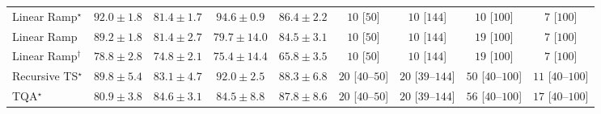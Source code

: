 \begin{tabular}{l|cccc|cccc|}
Linear Ramp$^\star$ & {\cellcolor[HTML]{760C71}} \color[HTML]{F1F1F1} $92.0\pm 1.8$ & {\cellcolor[HTML]{8B5CAA}} \color[HTML]{F1F1F1} $81.4\pm 1.7$ & {\cellcolor[HTML]{5D055A}} \color[HTML]{F1F1F1} $94.6\pm 0.9$ & {\cellcolor[HTML]{863595}} \color[HTML]{F1F1F1} $86.4\pm 2.2$ & {\cellcolor[HTML]{FFF7F3}} \color[HTML]{000000} $10$ [$50$] & {\cellcolor[HTML]{FFF7F3}} \color[HTML]{000000} $10$ [$144$] & {\cellcolor[HTML]{FFF7F3}} \color[HTML]{000000} $10$ [$100$] & {\cellcolor[HTML]{FFF7F3}} \color[HTML]{000000} $7$ [$100$] \\
Linear Ramp & {\cellcolor[HTML]{831C84}} \color[HTML]{F1F1F1} $89.2\pm 1.8$ & {\cellcolor[HTML]{8B5CAA}} \color[HTML]{F1F1F1} $81.4\pm 2.7$ & {\cellcolor[HTML]{8C69B0}} \color[HTML]{F1F1F1} $79.7\pm 14.0$ & {\cellcolor[HTML]{88459F}} \color[HTML]{F1F1F1} $84.5\pm 3.1$ & {\cellcolor[HTML]{FFF7F3}} \color[HTML]{000000} $10$ [$50$] & {\cellcolor[HTML]{FFF7F3}} \color[HTML]{000000} $10$ [$144$] & {\cellcolor[HTML]{FFF5F1}} \color[HTML]{000000} $19$ [$100$] & {\cellcolor[HTML]{FFF7F3}} \color[HTML]{000000} $7$ [$100$] \\
Linear Ramp$^\dagger$ & {\cellcolor[HTML]{8C70B3}} \color[HTML]{F1F1F1} $78.8\pm 2.8$ & {\cellcolor[HTML]{8C8DC2}} \color[HTML]{F1F1F1} $74.8\pm 2.1$ & {\cellcolor[HTML]{8C89C0}} \color[HTML]{F1F1F1} $75.4\pm 14.4$ & {\cellcolor[HTML]{ABC5DF}} \color[HTML]{000000} $65.8\pm 3.5$ & {\cellcolor[HTML]{FFF7F3}} \color[HTML]{000000} $10$ [$50$] & {\cellcolor[HTML]{FFF7F3}} \color[HTML]{000000} $10$ [$144$] & {\cellcolor[HTML]{FFF5F1}} \color[HTML]{000000} $19$ [$100$] & {\cellcolor[HTML]{FFF7F3}} \color[HTML]{000000} $7$ [$100$] \\
Recursive TS$^\star$ & {\cellcolor[HTML]{821781}} \color[HTML]{F1F1F1} $89.8\pm 5.4$ & {\cellcolor[HTML]{8950A4}} \color[HTML]{F1F1F1} $83.1\pm 4.7$ & {\cellcolor[HTML]{760C71}} \color[HTML]{F1F1F1} $92.0\pm 2.5$ & {\cellcolor[HTML]{84258B}} \color[HTML]{F1F1F1} $88.3\pm 6.8$ & {\cellcolor[HTML]{FFF4F0}} \color[HTML]{000000} $20$ [$40$--$50$] & {\cellcolor[HTML]{FFF4F0}} \color[HTML]{000000} $20$ [$39$--$144$] & {\cellcolor[HTML]{FEEDE9}} \color[HTML]{000000} $50$ [$40$--$100$] & {\cellcolor[HTML]{FFF6F2}} \color[HTML]{000000} $11$ [$40$--$100$] \\
TQA$^\star$ & {\cellcolor[HTML]{8B60AC}} \color[HTML]{F1F1F1} $80.9\pm 3.8$ & {\cellcolor[HTML]{88449E}} \color[HTML]{F1F1F1} $84.6\pm 3.1$ & {\cellcolor[HTML]{88459F}} \color[HTML]{F1F1F1} $84.5\pm 8.8$ & {\cellcolor[HTML]{85288D}} \color[HTML]{F1F1F1} $87.8\pm 8.6$ & {\cellcolor[HTML]{FFF4F0}} \color[HTML]{000000} $20$ [$40$--$50$] & {\cellcolor[HTML]{FFF4F0}} \color[HTML]{000000} $20$ [$39$--$144$] & {\cellcolor[HTML]{FEEBE8}} \color[HTML]{000000} $56$ [$40$--$100$] & {\cellcolor[HTML]{FFF5F1}} \color[HTML]{000000} $17$ [$40$--$100$] \\

\end{tabular}
